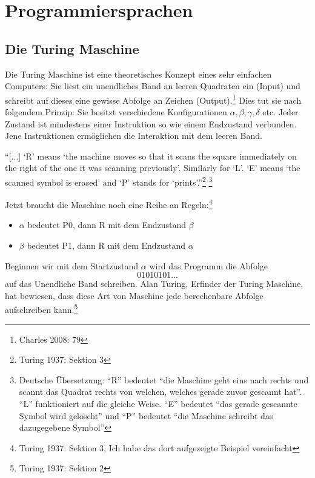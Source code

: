 \documentclass[10pt,a4paper]{article}
\begin{document}
\section{Programmiersprachen}
\subsection{Die Turing Maschine}
Die Turing Maschine ist eine theoretisches Konzept eines sehr einfachen Computers: Sie liest ein unendliches Band an leeren Quadraten ein (Input) und schreibt auf dieses eine gewisse Abfolge an Zeichen (Output).\footnote{Charles 2008: 79} Dies tut sie nach folgendem Prinzip: Sie besitzt verschiedene Konfigurationen $\alpha, \beta, \gamma, \delta$ etc. Jeder Zustand ist mindestens einer Instruktion so wie einem Endzustand verbunden. Jene Instruktionen ermöglichen die Interaktion mit dem leeren Band. 
\begin{displayquote}
\enquote{[...] \enquote{R} means \enquote{the machine moves
so that it scans the square immediately on the right of the one it was
scanning previously}. Similarly for \enquote{L}. \enquote{E} means \enquote{the scanned
symbol is erased} and \enquote{P} stands for \enquote{prints}.}\footnote{Turing 1937: Sektion 3} \footnote{Deutsche Übersetzung: \enquote{R} bedeutet \enquote{die Maschine geht eins nach rechts und scannt das Quadrat rechts von welchen, welches gerade zuvor gescannt hat}. \enquote{L} funktioniert auf die gleiche Weise. \enquote{E} bedeutet \enquote{das gerade gescannte Symbol wird gelöscht} und \enquote{P} bedeutet \enquote{die Maschine schreibt das dazugegebene Symbol}}
\end{displayquote}
Jetzt braucht die Maschine noch eine Reihe an Regeln:\footnote{Turing 1937: Sektion 3, Ich habe das dort aufgezeigte Beispiel vereinfacht}
\begin{itemize}
    \item $\alpha$ bedeutet P0, dann R mit dem Endzustand $\beta$
    \item $\beta$ bedeutet P1, dann R mit dem Endzustand $\alpha$
\end{itemize}
Beginnen wir mit dem Startzustand $\alpha$ wird das Programm die Abfolge $$01010101...$$ auf das Unendliche Band schreiben. Alan Turing, Erfinder der Turing Maschine, hat bewiesen, dass diese Art von Maschine jede berechenbare Abfolge aufschreiben kann.\footnote{Turing 1937: Sektion 2}
\end{document}
